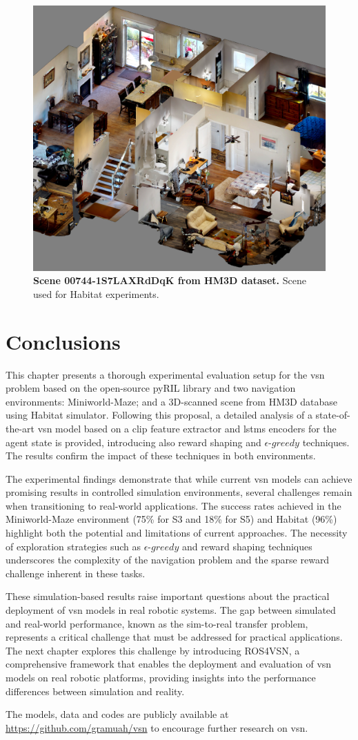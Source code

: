 \begin{figure}
    \centering
    \includegraphics[width=0.6\linewidth]{figures/understanding_vsn/dollhouse}
    \caption{\textbf{Scene 00744-1S7LAXRdDqK from HM3D dataset.} Scene used for Habitat experiments.}
    \label{fig:dollhouse}
\end{figure}


\section{Conclusions}
\label{sec:conclusions}

This chapter presents a thorough experimental evaluation setup for the \acrshort{vsn} problem based on the open-source pyRIL library and two navigation environments: Miniworld-Maze; and a 3D-scanned scene from HM3D database using Habitat simulator.
Following this proposal, a detailed analysis of a state-of-the-art \acrshort{vsn} model based on a \acrshort{clip} feature extractor and \acrshort{lstm}s encoders for the agent state is provided, introducing also reward shaping and $\epsilon\text{-}greedy$ techniques.
The results confirm the impact of these techniques in both environments.

The experimental findings demonstrate that while current \acrshort{vsn} models can achieve promising results in controlled simulation environments, several challenges remain when transitioning to real-world applications.
The success rates achieved in the Miniworld-Maze environment (75\% for S3 and 18\% for S5) and Habitat (96\%) highlight both the potential and limitations of current approaches.
The necessity of exploration strategies such as $\epsilon\text{-}greedy$ and reward shaping techniques underscores the complexity of the navigation problem and the sparse reward challenge inherent in these tasks.

These simulation-based results raise important questions about the practical deployment of \acrshort{vsn} models in real robotic systems.
The gap between simulated and real-world performance, known as the sim-to-real transfer problem, represents a critical challenge that must be addressed for practical applications.
The next chapter explores this challenge by introducing ROS4VSN, a comprehensive framework that enables the deployment and evaluation of \acrshort{vsn} models on real robotic platforms, providing insights into the performance differences between simulation and reality.

The models, data and codes are publicly available at \url{https://github.com/gramuah/vsn} to encourage further research on \acrshort{vsn}\@.